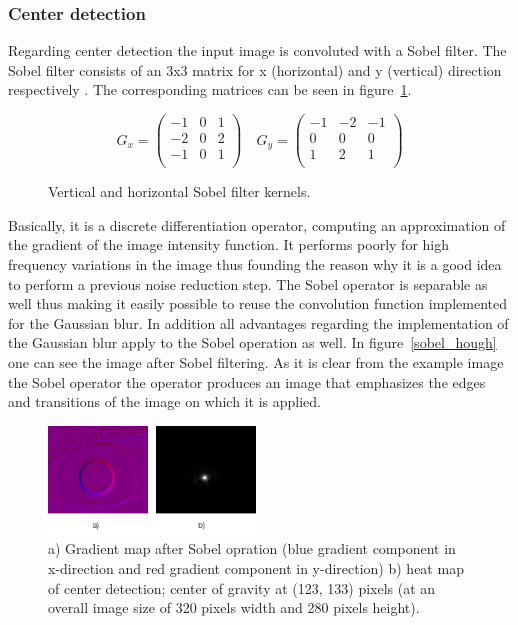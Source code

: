 \documentclass[journal]{IEEEtran}
\begin{document}
\subsubsection{Center detection}
Regarding center detection the input image is convoluted with a Sobel filter. The Sobel filter consists of an 3x3 matrix for x (horizontal) and y (vertical) direction respectively \cite{sobel3x3}. The corresponding matrices can be seen in figure~\ref{fig:sobel}. 
\begin{figure}[ht]
\[
	G_x = \left(\begin{array}{ccc}
		-1 & 0 & 1 \\
		-2 & 0 & 2 \\
		-1 & 0 & 1 \\
	\end{array}\right) \quad G_y = \left(\begin{array}{ccc}
		-1 & -2 & -1 \\
		0 & 0 & 0 \\
		1 & 2 & 1 \\
	\end{array}\right)
\]
	\caption{Vertical and horizontal Sobel filter kernels.}
	\label{fig:sobel}
\end{figure} 
Basically, it is a discrete differentiation operator, computing an approximation of the gradient of the image intensity function. It performs poorly for high frequency variations in the image thus founding the reason why it is a good idea to perform a previous noise reduction step. The Sobel operator is separable as well thus making it easily possible to reuse the convolution function implemented for the Gaussian blur. In addition all advantages regarding the implementation of the Gaussian blur apply to the Sobel operation as well. In figure~\ref{sobel_hough} one can see the image after Sobel filtering. As it is clear from the example image the Sobel operator the operator produces an image that emphasizes the edges and transitions of the image on which it is applied.
\begin{figure}[ht]
	\centering
  \includegraphics[width=0.49\textwidth]{iris/sobel_hough.png}
	\caption{a) Gradient map after Sobel opration (blue gradient component in x-direction and red gradient component in y-direction) b) heat map of center detection; center of gravity at (123, 133) pixels (at an overall image size of 320 pixels width and 280 pixels height).}
	\label{fig:sobel_hough}
\end{figure}
\end{document}
